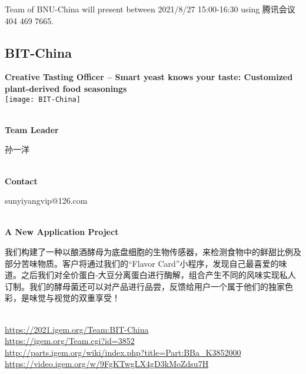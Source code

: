\vfill{}









Team of BNU-China will present between  2021/8/27 15:00-16:30       using 腾讯会议 404 469 7665.
\newpage


\subsection{\textcolor{Blu}{ BIT-China } }
\vspace{5mm}
\begin{center}
\large{
  \textbf{ Creative Tasting Officer -- Smart yeast knows your taste: Customized plant-derived food seasonings }\\

  \texttt{[image: BIT-China]}
}
\end{center}
\textbf{\\Team Leader}

  孙一洋


\textbf{\\Contact}

  sunyiyangvip@126.com


\textbf{\\A New Application Project\\}\begin{spacing}{1.5}

我们构建了一种以酿酒酵母为底盘细胞的生物传感器，来检测食物中的鲜甜比例及部分苦味物质。客户将通过我们的“Flavor Card”小程序，发现自己最喜爱的味道。之后我们对全价蛋白-大豆分离蛋白进行酶解，组合产生不同的风味实现私人订制。我们的酵母菌还可以对产品进行品尝，反馈给用户一个属于他们的独家色彩，是味觉与视觉的双重享受！\end{spacing}
\\

\url{https://2021.igem.org/Team:BIT-China }\\
\url{https://igem.org/Team.cgi?id=3852 }\\
\url{http://parts.igem.org/wiki/index.php?title=Part:BBa_K3852000 }\\
\url{https://video.igem.org/w/9FgKTwgLX4gD3kMoZdsu7H }\\

\vfill{}









